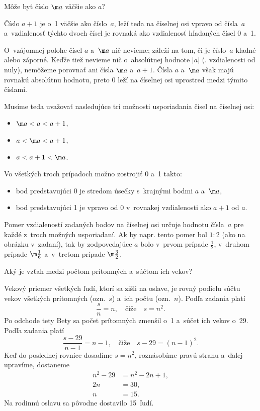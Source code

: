 {%
\napad
Môže byť číslo $\m a$ väčšie ako $a$?

\riesenie
Číslo $a+1$ je o~1 väčšie ako číslo~$a$, leží teda na číselnej osi vpravo od čísla~$a$ a~vzdialenosť týchto dvoch čísel je rovnaká ako vzdialenosť hľadaných čísel 0 a~1.

O~vzájomnej polohe čísel $a$ a~$\m a$ nič nevieme; záleží na tom, či je číslo~$a$ kladné alebo záporné.
Keďže tiež nevieme nič o~absolútnej hodnote $|a|$ (\tj. vzdialenosti od nuly), nemôžeme porovnať ani čísla $\m a$ a~$a+1$.
Čísla $a$ a~$\m a$ však majú rovnakú absolútnu hodnotu, preto 0 leží na číselnej osi uprostred medzi týmito číslami.

Musíme teda uvažovať nasledujúce tri možnosti usporiadania čísel na číselnej osi:
\begin{itemize}
\item $\m a<a<a+1$,
\item $a<\m a<a+1$,
\item $a<a+1<\m a$.
\end{itemize}

Vo všetkých troch prípadoch možno zostrojiť 0 a~1 takto:
\begin{itemize}
\item bod predstavujúci 0 je stredom úsečky s~krajnými bodmi $a$ a~$\m a$,
\item bod predstavujúci 1 je vpravo od 0 v~rovnakej vzdialenosti ako $a+1$ od $a$.%
%
%
\end{itemize}


\poznamka
Pomer vzdialeností zadaných bodov na číselnej osi určuje hodnotu čísla~$a$ pre každé z~troch možných usporiadaní.
Ak by napr. tento pomer bol $1:2$ (ako na obrázku v~zadaní), tak by zodpovedajúce $a$ bolo v~prvom prípade $\frac12$, v~druhom prípade $\m\frac16$ a~v~treťom prípade $\m\frac32$.
}

{%
\napad
Aký je vzťah medzi počtom prítomných a~súčtom ich vekov?

\riesenie
Vekový priemer všetkých ľudí, ktorí sa zišli na oslave, je rovný podielu súčtu vekov všetkých prítomných (ozn.~$s$) a~ich počtu (ozn.~$n$).
Podľa zadania platí
$$
\frac{s}n=n,
\quad\text{čiže}\quad
s=n^2.
$$
Po odchode tety Bety sa počet prítomných zmenšil o~1 a~súčet ich vekov o~29.
Podľa zadania platí
$$
\frac{s-29}{n-1}=n-1,
\quad\text{čiže}\quad
s-29=(n-1)^2.
$$
Keď do poslednej rovnice dosadíme $s=n^2$, roznásobíme pravú stranu a~ďalej upravíme, dostaneme
$$
\begin{aligned}
n^2-29&=n^2-2n+1,\\
2n&=30,\\
n&=15.
\end{aligned}
$$
Na rodinnú oslavu sa pôvodne dostavilo 15~ľudí.}

